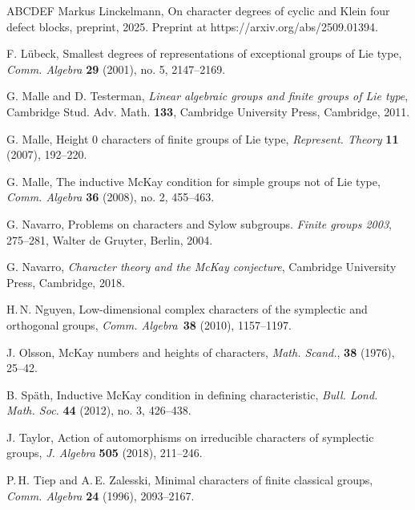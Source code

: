 \documentclass[12pt]{amsart}
\theoremstyle{plain}
\theoremstyle{definition}
\numberwithin{equation}{section}
\begin{document}
\begin{thebibliography}{ABCDEF}
Markus Linckelmann, On character degrees of cyclic and Klein four
defect blocks, preprint, 2025. Preprint at
https://arxiv.org/abs/2509.01394.

F. L\"{u}beck, Smallest degrees of representations of exceptional
groups of Lie type, \emph{Comm. Algebra} \textbf{29} (2001), no. 5,
2147--2169.

G. Malle and D. Testerman, \emph{Linear algebraic groups and finite
groups of Lie type}, Cambridge Stud. Adv. Math. \textbf{133},
Cambridge University Press, Cambridge, 2011.

G. Malle, Height $0$ characters of finite groups of Lie type,
\emph{Represent. Theory} \textbf{11} (2007), 192--220.

G. Malle, The inductive McKay condition for simple groups not of Lie
type, \emph{Comm. Algebra} \textbf{36} (2008), no. 2, 455--463.


G. Navarro, Problems on characters and Sylow subgroups. {\em Finite
groups 2003}, 275--281, Walter de Gruyter, Berlin, 2004.


G. Navarro, {\it Character theory and the McKay conjecture},
Cambridge University Press, Cambridge, 2018.

H.\,N. Nguyen, Low-dimensional complex characters of the symplectic
and orthogonal groups, \emph{Comm. Algebra}~\textbf{38} (2010),
1157--1197.

J. Olsson, McKay numbers and heights of characters, \emph{Math.
Scand.}, \textbf{38} (1976), 25--42.

B. Sp\"{a}th, Inductive McKay condition in defining characteristic,
\emph{Bull. Lond. Math. Soc.} \textbf{44} (2012), no. 3, 426--438.

J. Taylor, Action of automorphisms on irreducible characters of
symplectic groups, \emph{J. Algebra} \textbf{505} (2018), 211--246.

P.\,H. Tiep and A.\,E. Zalesski, Minimal characters of finite
classical groups, \emph{Comm. Algebra} \textbf{24} (1996),
2093--2167.


\end{thebibliography}
\end{document}
